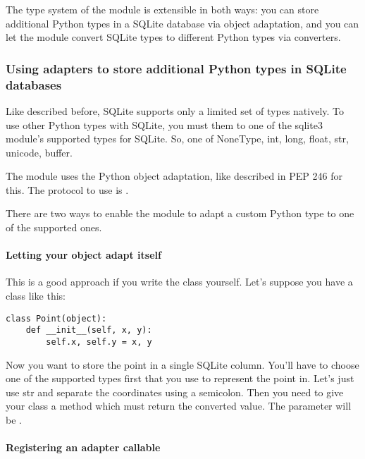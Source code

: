 The type system of the  module is extensible in both ways: you can store
additional Python types in a SQLite database via object adaptation, and you can
let the  module convert SQLite types to different Python types via
converters.

\subsubsection{Using adapters to store additional Python types in SQLite databases}

Like described before, SQLite supports only a limited set of types natively. To
use other Python types with SQLite, you must  them to one of the sqlite3
module's supported types for SQLite. So, one of NoneType, int, long, float,
str, unicode, buffer.

The  module uses the Python object adaptation, like described in PEP 246
for this.  The protocol to use is .

There are two ways to enable the  module to adapt a custom Python type
to one of the supported ones.

\paragraph{Letting your object adapt itself}

This is a good approach if you write the class yourself. Let's suppose you have
a class like this:

\begin{verbatim}
class Point(object):
    def __init__(self, x, y):
        self.x, self.y = x, y
\end{verbatim}

Now you want to store the point in a single SQLite column. You'll have to
choose one of the supported types first that you use to represent the point in.
Let's just use str and separate the coordinates using a semicolon. Then you
need to give your class a method  which must
return the converted value. The parameter  will be
.



\paragraph{Registering an adapter callable}


